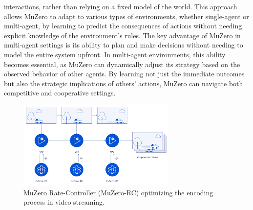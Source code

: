 interactions, rather than relying on a fixed model of the world. This approach
allows MuZero to adapt to various types of environments, whether single-agent
or multi-agent, by learning to predict the consequences of actions without
needing explicit knowledge of the environment’s rules. The key advantage of
MuZero in multi-agent settings is its ability to plan and make decisions
without needing to model the entire system upfront. In multi-agent
environments, this ability becomes essential, as MuZero can dynamically adjust
its strategy based on the observed behavior of other agents. By learning not
just the immediate outcomes but also the strategic implications of others'
actions, MuZero can navigate both competitive and cooperative settings.
\begin{figure}[t]
    \centering
    \includegraphics[width=0.7\textwidth]{sections/8Future Directions/MuZeroRC.png}
    \caption{MuZero Rate-Controller (MuZero-RC) optimizing the encoding process in video streaming.}
\end{figure}